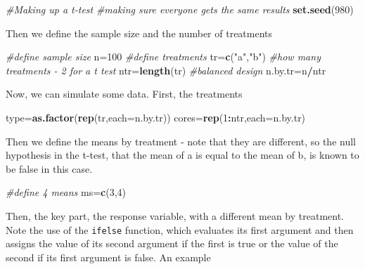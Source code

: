 \documentclass[
]{book}
\newenvironment{Shaded}{\begin{snugshade}}{\end{snugshade}}
\newcommand{\CommentTok}[1]{\textcolor[rgb]{0.56,0.35,0.01}{\textit{#1}}}
\newcommand{\DataTypeTok}[1]{\textcolor[rgb]{0.13,0.29,0.53}{#1}}
\newcommand{\DecValTok}[1]{\textcolor[rgb]{0.00,0.00,0.81}{#1}}
\newcommand{\KeywordTok}[1]{\textcolor[rgb]{0.13,0.29,0.53}{\textbf{#1}}}
\newcommand{\NormalTok}[1]{#1}
\newcommand{\OperatorTok}[1]{\textcolor[rgb]{0.81,0.36,0.00}{\textbf{#1}}}
\newcommand{\StringTok}[1]{\textcolor[rgb]{0.31,0.60,0.02}{#1}}
\begin{document}
\begin{Shaded}
\begin{Highlighting}[]
\CommentTok{#Making up a t-test}
\CommentTok{#making sure everyone gets the same results}
\KeywordTok{set.seed}\NormalTok{(}\DecValTok{980}\NormalTok{)}
\end{Highlighting}
\end{Shaded}

Then we define the sample size and the number of treatments

\begin{Shaded}
\begin{Highlighting}[]
\CommentTok{#define sample size}
\NormalTok{n=}\DecValTok{100}
\CommentTok{#define treatments}
\NormalTok{tr=}\KeywordTok{c}\NormalTok{(}\StringTok{"a"}\NormalTok{,}\StringTok{"b"}\NormalTok{)}
\CommentTok{#how many treatments - 2 for a t test}
\NormalTok{ntr=}\KeywordTok{length}\NormalTok{(tr)}
\CommentTok{#balanced design}
\NormalTok{n.by.tr=n}\OperatorTok{/}\NormalTok{ntr}
\end{Highlighting}
\end{Shaded}

Now, we can simulate some data. First, the treatments

\begin{Shaded}
\begin{Highlighting}[]
\NormalTok{type=}\KeywordTok{as.factor}\NormalTok{(}\KeywordTok{rep}\NormalTok{(tr,}\DataTypeTok{each=}\NormalTok{n.by.tr))}
\NormalTok{cores=}\KeywordTok{rep}\NormalTok{(}\DecValTok{1}\OperatorTok{:}\NormalTok{ntr,}\DataTypeTok{each=}\NormalTok{n.by.tr)}
\end{Highlighting}
\end{Shaded}

Then we define the means by treatment - note that they are different, so the null hypothesis in the t-test, that the mean of a is equal to the mean of b, is known to be false in this case.

\begin{Shaded}
\begin{Highlighting}[]
\CommentTok{#define 4 means}
\NormalTok{ms=}\KeywordTok{c}\NormalTok{(}\DecValTok{3}\NormalTok{,}\DecValTok{4}\NormalTok{)}
\end{Highlighting}
\end{Shaded}

Then, the key part, the response variable, with a different mean by treatment. Note the use of the \texttt{ifelse} function, which evaluates its first argument and then assigns the value of its second argument if the first is true or the value of the second if its first argument is false. An example
\end{document}
